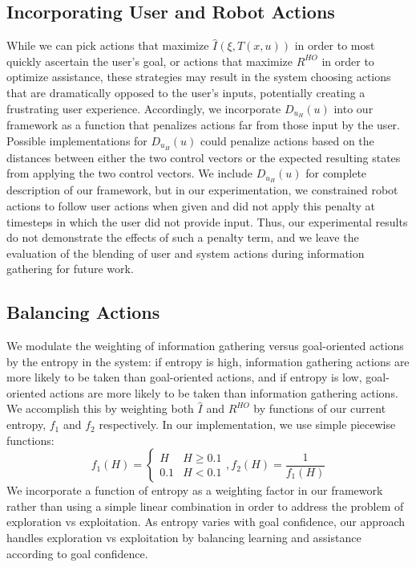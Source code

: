 \documentclass[conference]{IEEEtran}
\begin{document}
\subsection{Incorporating User and Robot Actions}
While we can pick actions that maximize $\hat{I}(\xi, T(x,u))$ in order to most quickly ascertain the user's goal, or actions that maximize $R^{HO}$ in order to optimize assistance, these strategies may result in the system choosing actions that are dramatically opposed to the user's inputs, potentially creating a frustrating user experience. Accordingly, we incorporate $D_{u_H}(u)$ into our framework as a function that penalizes actions far from those input by the user. Possible implementations for $D_{u_H}(u)$ could penalize actions based on the distances between either the two control vectors or the expected resulting states from applying the two control vectors. We include $D_{u_H}(u)$ for complete description of our framework, but in our experimentation, we constrained robot actions to follow user actions when given and did not apply this penalty at timesteps in which the user did not provide input. Thus, our experimental results do not demonstrate the effects of such a penalty term, and we leave the evaluation of the blending of user and system actions during information gathering for future work.

\subsection{Balancing Actions}

We modulate the weighting of information gathering versus goal-oriented actions by the entropy in the system: if entropy is high, information gathering actions are more likely to be taken than goal-oriented actions, and if entropy is low, goal-oriented actions are more likely to be taken than information gathering actions. We accomplish this by weighting both $\hat{I}$ and $R^{HO}$ by functions of our current entropy, $f_1$ and $f_2$ respectively. In our implementation, we use simple piecewise functions:
\[
f_1(H) =
\begin{cases}
H & H\geq 0.1 \\
0.1 & H < 0.1
\end{cases}
,f_2(H) = \frac{1}{f_1(H)}
\]
We incorporate a function of entropy as a weighting factor in our framework rather than using a simple linear combination in order to address the problem of exploration vs exploitation. As entropy varies with goal confidence, our approach handles exploration vs exploitation by balancing learning and assistance according to goal confidence.
\end{document}
